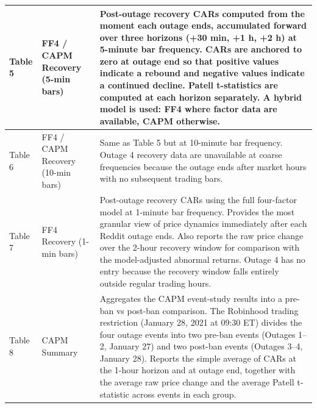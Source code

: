 \begin{table}[htbp]
\begin{tabular}{llp{9cm}}
    \hline
    Table 5 & FF4 / CAPM Recovery (5-min bars) & Post-outage recovery CARs computed from the moment each outage ends, accumulated forward over three horizons (+30 min, +1 h, +2 h) at 5-minute bar frequency. CARs are anchored to zero at outage end so that positive values indicate a rebound and negative values indicate a continued decline. Patell t-statistics are computed at each horizon separately. A hybrid model is used: FF4 where factor data are available, CAPM otherwise. \\
    \hline
    Table 6 & FF4 / CAPM Recovery (10-min bars) & Same as Table 5 but at 10-minute bar frequency. Outage 4 recovery data are unavailable at coarse frequencies because the outage ends after market hours with no subsequent trading bars. \\
    \hline
    Table 7 & FF4 Recovery (1-min bars) & Post-outage recovery CARs using the full four-factor model at 1-minute bar frequency. Provides the most granular view of price dynamics immediately after each Reddit outage ends. Also reports the raw price change over the 2-hour recovery window for comparison with the model-adjusted abnormal returns. Outage 4 has no entry because the recovery window falls entirely outside regular trading hours. \\
    \hline
    Table 8 & CAPM Summary & Aggregates the CAPM event-study results into a pre-ban vs post-ban comparison. The Robinhood trading restriction (January 28, 2021 at 09:30 ET) divides the four outage events into two pre-ban events (Outages 1–2, January 27) and two post-ban events (Outages 3–4, January 28). Reports the simple average of CARs at the 1-hour horizon and at outage end, together with the average raw price change and the average Patell t-statistic across events in each group. \\
    \hline
    \hline
  \end{tabular}
\end{table}

